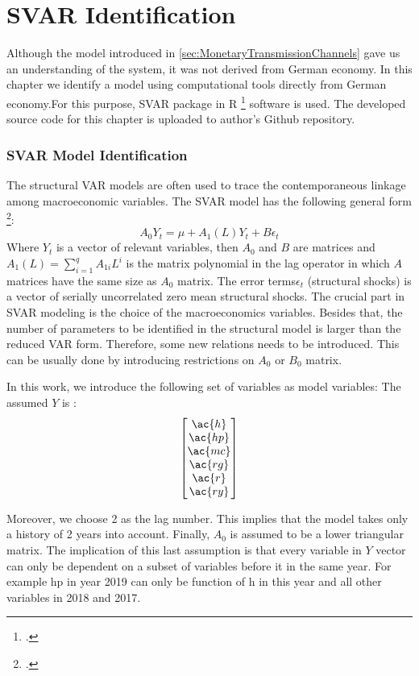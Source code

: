 \newpage
\section{\ac{SVAR} Identification} \label{SVARIdentification}
Although the model introduced in \ref{sec:MonetaryTransmissionChannels} gave us an understanding of the system, it was not derived from German economy. In this chapter we identify a model using computational tools directly from German economy.For this purpose, SVAR package in R \footcite[See.][]{Lange2020} software is used. The developed source code for this chapter is uploaded to author's Github repository.
\subsubsection{SVAR Model Identification}
The structural VAR models are often used to trace the contemporaneous linkage among macroeconomic variables. The SVAR model has the following general form  \footcite[See.][]{Lange2020}: 
\[ A_0 Y_t = \mu+  A_1(L) Y_t + B \epsilon_t \]
 Where $Y_t$ is a vector of relevant variables, then $A_0$ and $B$ are matrices and $A_1(L) = \sum\limits_{i=1}^ qA_{1i} L^i $ is the matrix polynomial in the lag operator in which $A$ matrices have the same size as $A_0$ matrix. The error terms$\epsilon_t$ (structural shocks) is a vector of serially uncorrelated zero mean structural shocks. The crucial part in \ac{SVAR} modeling is the choice of the macroeconomics variables. Besides that, the number of parameters to be identified in the structural model is larger than the reduced VAR form. Therefore, some new relations needs to be introduced. This can be usually done by introducing restrictions on $A_0$ or $B_0$ matrix. 

In this work, we introduce the following set of variables as model variables: 
The assumed $Y$ is :
\[ 
 \begin{bmatrix}
        \ac{h} \\ 
        \ac{hp} \\
        \ac{mc} \\
        \ac{rg} \\
        \ac{r} \\
        \ac{ry} \\
  \end{bmatrix}
\]

Moreover, we choose 2 as the lag number. This implies that the model takes only a history of 2 years into account.  Finally, $A_0$ is assumed to be a lower triangular matrix. The implication of this last assumption is that every variable in $Y$ vector can only be dependent on a subset of variables before it in the same year. For example \ac{hp} in year 2019 can only be function of \ac{h}  in this year and all other variables in 2018 and 2017.    


